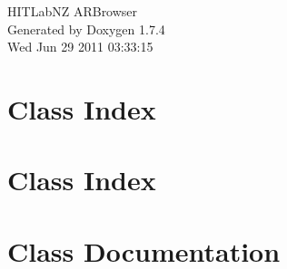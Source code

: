\documentclass[a4paper]{book}
\begin{document}
\hypersetup{pageanchor=false}
\begin{titlepage}
\vspace*{7cm}
\begin{center}
{\Large HITLabNZ ARBrowser }\\
\vspace*{1cm}
{\large Generated by Doxygen 1.7.4}\\
\vspace*{0.5cm}
{\small Wed Jun 29 2011 03:33:15}\\
\end{center}
\end{titlepage}
\clearemptydoublepage
{}
\tableofcontents
\clearemptydoublepage
{}
\hypersetup{pageanchor=true}
\chapter{Class Index}

\chapter{Class Index}

\chapter{Class Documentation}















\printindex
\end{document}
